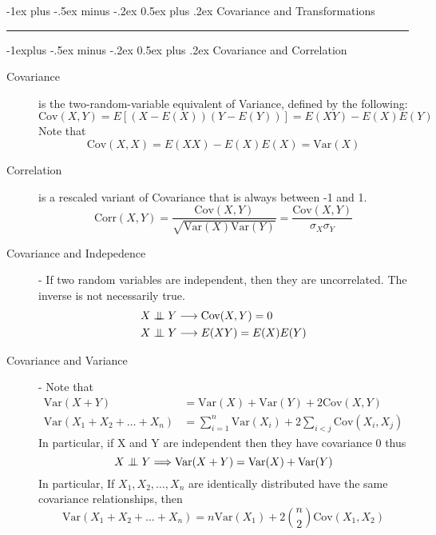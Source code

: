 \documentclass[10pt,landscape]{article}
\makeatletter
\theoremstyle{definition}
\newcommand\independent{\protect\mathpalette{\protect\independenT}{\perp}}
\def\independenT#1#2{\mathrel{\setbox0\hbox{$#1#2$}%
    \copy0\kern-\wd0\mkern4mu\box0}}
\newcommand{\var}{\textrm{Var}}
\newcommand{\cov}{\textrm{Cov}}
\newcommand{\corr}{\textrm{Corr}}
\renewcommand{\section}{\@startsection{section}{1}{0mm}%
                                {-1ex plus -.5ex minus -.2ex}%
                                {0.5ex plus .2ex}%
                                {\normalfont\large\bfseries}}
\renewcommand{\subsection}{\@startsection{subsection}{2}{0mm}%
                                {-1explus -.5ex minus -.2ex}%
                                {0.5ex plus .2ex}%
                                {\normalfont\normalsize\bfseries}}
\makeatother
\begin{document}
\begin{multicols}{3}
\section{Covariance and Transformations}\smallskip \hrule height 2pt \smallskip

\subsection{Covariance and Correlation}
\begin{description}
\item [Covariance] is the two-random-variable equivalent of Variance, defined by the following:
    \[\cov(X, Y) = E[(X - E(X))(Y - E(Y))] = E(XY) - E(X)E(Y)\]
    Note that 
    \[\cov(X, X) = E(XX) - E(X)E(X) =  \var(X)\]
\item [Correlation] is a rescaled variant of Covariance that is always between -1 and 1.
    \[\corr(X, Y) = \frac{\cov(X, Y)}{\sqrt{\var(X)\var(Y)}} = \frac{\cov(X, Y)}{\sigma_X\sigma_Y}\]
\item [Covariance and Indepedence] - If two random variables are independent, then they are uncorrelated. The inverse is not necessarily true. 
    \begin{align*}
    	X \independent Y &\longrightarrow \cov(X, Y) = 0 \\
    	X \independent Y &\longrightarrow E(XY) = E(X)E(Y)
    \end{align*}
\item [Covariance and Variance] - Note that
    \begin{align*}
        \var(X + Y) &= \var(X) + \var(Y) + 2\cov(X, Y) \\
        \var(X_1 + X_2 + \dots + X_n ) &= \sum_{i = 1}^{n}\var(X_i) + 2\sum_{i < j} \cov(X_i, X_j)
    \end{align*}
    In particular, if X and Y are independent then they have covariance 0 thus
    \[X \independent Y \Longrightarrow \var(X + Y) = \var(X) + \var(Y)\]
    In particular, If $X_1, X_2, \dots, X_n$ are identically distributed have the same covariance relationships, then 
    \[\var(X_1 + X_2 + \dots + X_n ) = n\var(X_1) + 2{n \choose 2}\cov(X_1, X_2)\]
    

\end{description}
\end{multicols}
\end{document}
